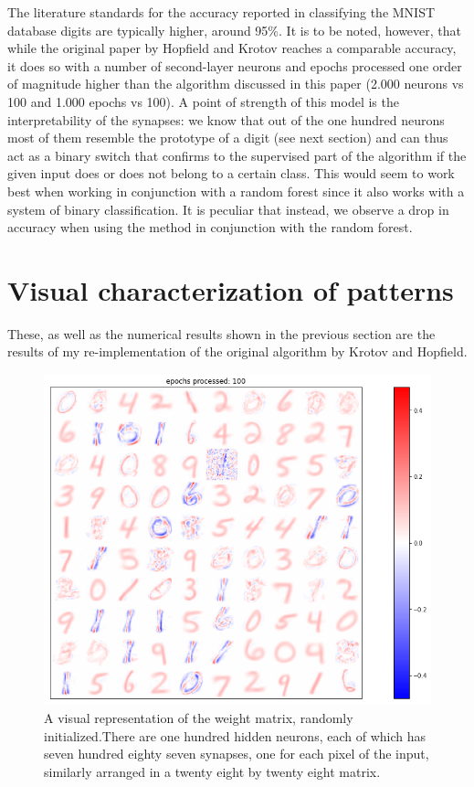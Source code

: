 \documentclass[a4paper]{report}
\begin{document}
The literature standards for the accuracy reported in classifying the MNIST database digits are typically higher, around 95\%.
It is to be noted, however, that while the original paper by Hopfield and Krotov reaches a comparable accuracy, it does so with a number of second-layer neurons and epochs processed one order of magnitude higher than the algorithm discussed in this paper (2.000 neurons vs 100 and 1.000 epochs vs 100).
A point of strength of this model is the interpretability of the synapses:
we know that out of the one hundred neurons most of them resemble the prototype of a digit (see next section) and can thus act as a binary switch that confirms to the supervised part of the algorithm if the given input does or does not belong to a certain class.
This would seem to work best when working in conjunction with a random forest since it also works with a system of binary classification.
It is peculiar that instead, we observe a drop in accuracy when using the method in conjunction with the random forest.

\section{Visual characterization of patterns}
These, as well as the numerical results shown in the previous section are the results of my re-implementation of the original algorithm by Krotov and Hopfield.


\begin{figure} [H]
    \centering
    \includegraphics [width=12cm ] {h/uu_heatmap.png}
    \caption{A visual representation of the weight matrix, randomly initialized.There are one hundred hidden neurons, each of which has seven hundred eighty seven synapses, one for each pixel of the input, similarly arranged in a twenty eight by twenty eight matrix.}
    \label{heatmap}
\end{figure}
\end{document}
